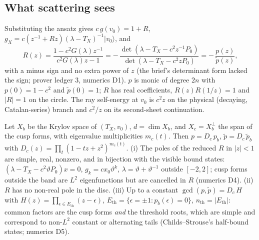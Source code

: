 \subsection{What scattering sees}

\begin{proposition}
\label{prop:cusp-reflection}
Substituting the ansatz gives $c\,g(v_0) = 1+R$, $g_X = c(z^{-1}+Rz)(\lambda-T_X)^{-1}|v_0\rangle$, and
\[
R(z) = \frac{1-c^2G(\lambda)z^{-1}}{c^2G(\lambda)z-1}
 = -\,\frac{\det(\lambda-T_X-c^2z^{-1}P_0)}{\det(\lambda-T_X-c^2zP_0)} = -\,\frac{p(z)}{\tilde p(z)},
\]
with a minus sign and no extra power of $z$ (the brief's determinant form lacked the sign; prover ledger 3,
numerics D1). $p$ is monic of degree $2n$ with $p(0) = 1-c^2$ and $\tilde p(0) = 1$; $R$ has real
coefficients, $R(z)R(1/z) = 1$ and $|R| = 1$ on the circle. The ray self-energy at $v_0$ is $c^2z$ on the
physical (decaying, Catalan-series) branch and $c^2/z$ on its second-sheet continuation.
\end{proposition}

\begin{proposition}
\label{prop:cusp-visible-spectrum}
Let $X_b$ be the Krylov space of $(T_X,v_0)$, $d = \dim X_b$, and $X_c = X_b^\perp$ the span of the cusp
forms, with eigenvalue multiplicities $m_c(t)$. Then $p = D_c\,p_b$, $\tilde p = D_c\,\tilde p_b$ with
$D_c(z) = \prod_t(1-tz+z^2)^{m_c(t)}$. (i) The poles of the reduced $R$ in $|z|<1$ are simple, real, nonzero,
and in bijection with the visible bound states: $(\lambda - T_X - c^2\vartheta P_0)x = 0$, $g_k = cx_0\vartheta^k$,
$\lambda = \vartheta+\vartheta^{-1}$ outside $[-2,2]$; cusp forms outside the band are $L^2$ eigenfunctions but
are cancelled in $R$ (numerics D4). (ii) $R$ has no non-real pole in the disc. (iii) Up to a constant
$\gcd(p,\tilde p) = D_c\,H$ with $H(z) = \prod_{\epsilon\in E_{\mathrm{th}}}(z-\epsilon)$,
$E_{\mathrm{th}} = \{\epsilon = \pm1 : p_b(\epsilon) = 0\}$, $n_{\mathrm{th}} = |E_{\mathrm{th}}|$: common factors are the
cusp forms \emph{and} the threshold roots, which are simple and correspond to non-$L^2$ constant or
alternating tails (Childs--Strouse's half-bound states; numerics D5).
\end{proposition}

